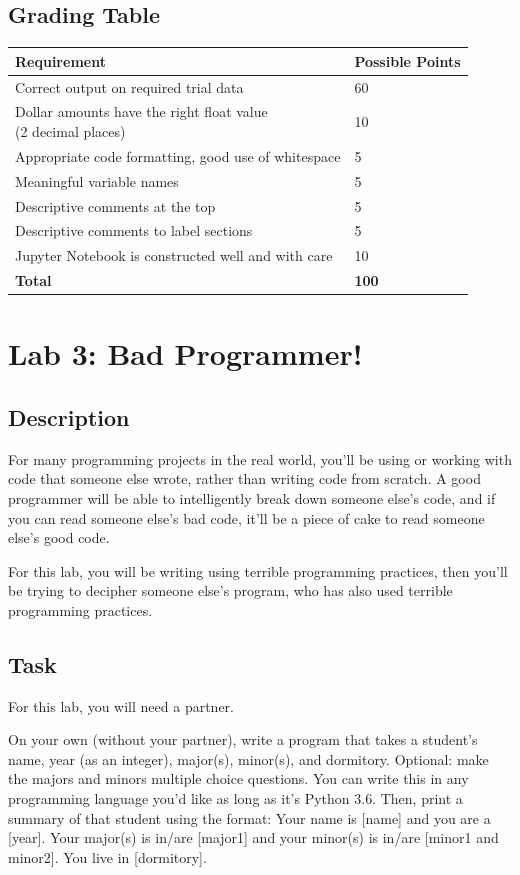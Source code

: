 \subsection*{Grading Table}
\begin{tabular}{|l|l|}
\hline
    Requirement & Possible Points \\ \hline
    Correct output on required trial data & 60 \\ \hline
    \makecell[l]{Dollar amounts have the right float value\\(2 decimal places)} & 10 \\ \hline
    Appropriate code formatting, good use of whitespace & 5 \\ \hline
    Meaningful variable names & 5 \\ \hline
    Descriptive comments at the top & 5 \\ \hline
    Descriptive comments to label sections & 5 \\ \hline
    Jupyter Notebook is constructed well and with care & 10 \\ \hline
    \textbf{Total} & \textbf{100} \\ \hline
\end{tabular}

\section*{Lab 3: Bad Programmer!}

\subsection*{Description}
For many programming projects in the real world, you'll be using or working with code that someone else wrote, rather than writing code from scratch. A good programmer will be able to intelligently break down someone else's code, and if you can read someone else's bad code, it'll be a piece of cake to read someone else's good code.

For this lab, you will be writing using terrible programming practices, then you'll be trying to decipher someone else's program, who has also used terrible programming practices.

\subsection*{Task}
For this lab, you will need a partner.

On your own (without your partner), write a program that takes a student's name, year (as an integer), major(s), minor(s), and dormitory. Optional: make the majors and minors multiple choice questions. You can write this in any programming language you'd like as long as it's Python 3.6. Then, print a summary of that student using the format: Your name is [name] and you are a [year]. Your major(s) is in/are [major1] and your minor(s) is in/are [minor1 and minor2]. You live in [dormitory].

